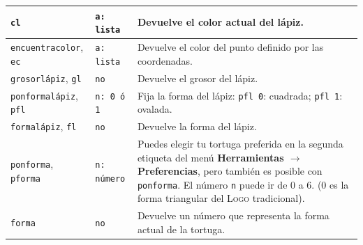 \begin{center}
\begin{longtable}{*{2}{|m{3cm}}|m{9cm}|}
     \texttt{cl}  & \texttt{a: lista} &
        Devuelve el color actual del l\'apiz. \\ \hline 
   \texttt{encuentracolor}, 
     \texttt{ec}  & \texttt{a: lista} &
        Devuelve el color del punto definido por las coordenadas. \\ \hline
   \texttt{grosorl\'apiz}, 
   \texttt{gl}  & \texttt{no} &
        Devuelve el grosor del l\'apiz. \\ \hline 
   \texttt{ponformal\'apiz}, 
   \texttt{pfl}  & \texttt{n: 0 \'o 1} &
        Fija la forma del l\'apiz: \texttt{pfl 0}: cuadrada; 
        \texttt{pfl 1}: ovalada. \\ \hline 
   \texttt{formal\'apiz}, 
   \texttt{fl}  & \texttt{no} &
        Devuelve la forma del l\'apiz. \\ \hline 
   \texttt{ponforma},  
      \texttt{pforma}  & \texttt{n: n\'umero} &
        Puedes elegir tu tortuga preferida en la segunda etiqueta del men\'u
        \textbf{Herramientas $\rightarrow$ Preferencias}, pero tambi\'en es posible
        con \texttt{ponforma}. El n\'umero \texttt{n} puede ir de 0 a 6. (0 es 
        la forma triangular del \textsc{Logo} tradicional). \\ \hline 
   \texttt{forma}  & \texttt{no} &
        Devuelve un n\'umero que representa la forma actual de la tortuga.
           \\ \hline 
\end{longtable} \end{center}


